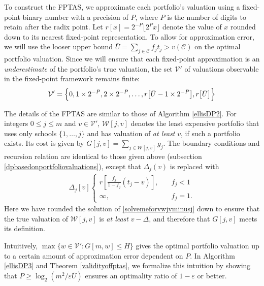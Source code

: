 To construct the FPTAS, we approximate each portfolio's valuation using a fixed-point binary number with a precision of $P$, where $P$ is the number of digits to retain after the radix point. Let $r[x] =  2^{-P}\lfloor 2^P x \rfloor$ denote the value of $x$ rounded down to its nearest fixed-point representation. To allow for approximation error, we will use the looser upper bound $\bar U = \sum_{j\in \mathcal{C}} f_j t_j > v(\mathcal{C})$ on the optimal portfolio valuation. Since we will ensure that each fixed-point approximation is an \emph{underestimate} of the portfolio's true valuation, the set $\mathcal{V}'$ of valuations observable in the fixed-point framework remains finite:
\begin{equation}
\mathcal{V}' = \Bigl\{0, 1\times 2^{-P}, 2\times 2^{-P}, \dots, r\bigl[\bar U- 1\times 2^{-P}\bigr], r\bigl[\bar U\bigr]\Bigr\}
\end{equation}


The details of the FPTAS are similar to those of Algorithm \ref{ellisDP2}. For integers $0 \leq j \leq m$ and $v \in \mathcal{V}'$, $\mathcal{W}[j, v]$ denotes the least expensive portfolio that uses only schools $\{ 1, \dots, j\}$ and has valuation of \emph{at least} $v$, if such a portfolio exists. Its cost is given by $G[j, v] = \sum_{j\in \mathcal{W}[j, v]} g_j$. The boundary conditions and recursion relation are identical to those given above (subsection \ref{dpbasedonportfoliovaluations}), except that $\Delta_j(v)$ is replaced with
\begin{align}
\Delta_j[v]
\begin{cases}
r\left[\frac{f_j}{1 - f_j} (t_j - v)\right], \quad & f_j < 1\\
\infty, &f_j = 1.
\end{cases} \label{clampeddeltajvdef}
\end{align}
Here we have rounded the solution of \eqref{solvemeforvwjvminusj} down to ensure that the true valuation of $\mathcal{W}[j, v]$ is \emph{at least} $v - \Delta$, and therefore that $G[j, v]$ meets its definition.

Intuitively, $\max\{ w \in \mathcal{V}': G[m, w] \leq H\}$ gives the optimal portfolio valuation up to a certain amount of approximation error dependent on $P$. In Algorithm \ref{ellisDP3} and Theorem \ref{validityoffptas}, we formalize this intuition by showing that $P \geq \log_{2}\left(m^2 / \varepsilon \bar U\right)$ ensures an optimality ratio of $1 - \varepsilon$ or better.

